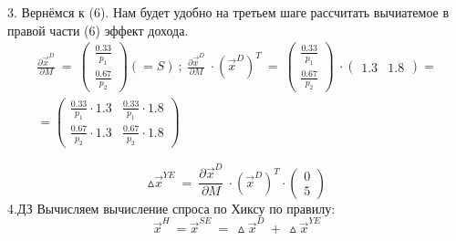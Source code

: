 \documentclass[12pt,a4paper]{article}
\begin{document}
	3. Вернёмся к (6). Нам будет удобно на третьем шаге рассчитать вычиатемое в правой части (6) эффект дохода.
\begin{gather*}
\frac{\partial \vec{x}^{D}}{\partial M} \ =\ \begin{pmatrix}
\frac{0.33}{p_{1}}\\
\frac{0.67}{p_{2}}
\end{pmatrix}( =S) \ ;\ \frac{\partial \vec{x}^{D}}{\partial M} \ \cdot (\vec{x}^{D})^{T} \ =\ \begin{pmatrix}
\frac{0.33}{p_{1}}\\
\frac{0.67}{p_{2}}
\end{pmatrix} \ \cdot \begin{pmatrix}
1.3 & 1.8
\end{pmatrix} =\\
=\begin{pmatrix}
\frac{0.33}{p_{1}} \cdot 1.3 & \frac{0.33}{p_{1}} \cdot 1.8\\
\frac{0.67}{p_{2}} \cdot 1.3 & \frac{0.67}{p_{2}} \cdot 1.8
\end{pmatrix}
\end{gather*}

\begin{equation*}
\vartriangle \vec{x}^{YE} \ =\ \frac{\partial \vec{x}^{D}}{\partial M} \ \cdot (\vec{x}^{D})^{T} \cdot \begin{pmatrix}
0\\
5
\end{pmatrix}
\end{equation*}
	4.$\displaystyle \boxed{\text{ДЗ}}$ Вычисляем вычисление спроса по Хиксу по правилу:
\begin{equation*}
\vec{x}^{H} \ =\vec{x}^{SE} \ =\ \vartriangle \vec{x}^{D} \ +\ \vartriangle \vec{x}^{YE}
\end{equation*}
\end{document}
